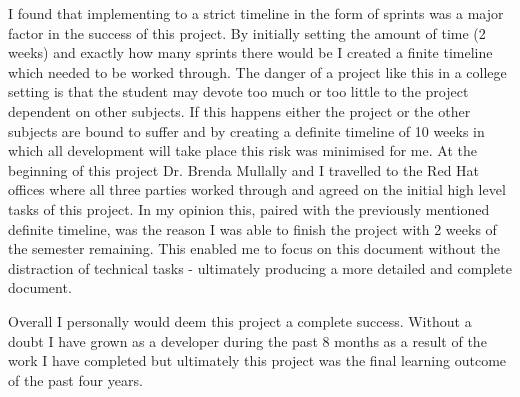 I found that implementing to a strict timeline in the form of sprints was a major factor in the success of this project. By initially setting the amount of time (2 weeks) and exactly how many sprints there would be I created a finite timeline which needed to be worked through. The danger of a project like this in a college setting is that the student may devote too much or too little to the project dependent on other subjects. If this happens either the project or the other subjects are bound to suffer and by creating a definite timeline of 10 weeks in which all development will take place this risk was minimised for me. At the beginning of this project Dr. Brenda Mullally and I travelled to the Red Hat offices where all three parties worked through and agreed on the initial high level tasks of this project. In my opinion this, paired with the previously mentioned definite timeline, was the reason I was able to finish the project with 2 weeks of the semester remaining. This enabled me to focus on this document without the distraction of technical tasks - ultimately producing a more detailed and complete document.

Overall I personally would deem this project a complete success. Without a doubt I have grown as a developer during the past 8 months as a result of the work I have completed but ultimately this project was the final learning outcome of the past four years.
